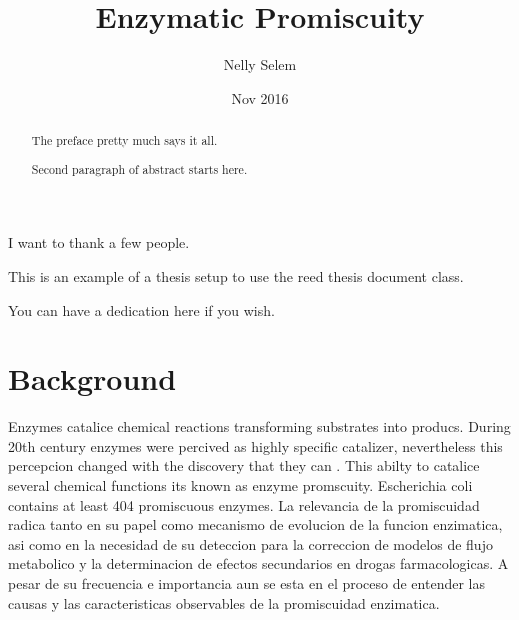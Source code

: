\documentclass[12pt,twoside]{reedthesis}
\title{Enzymatic Promiscuity}
\author{Nelly Selem}
\date{Nov 2016}
\begin{document}
      \maketitle
  
  \frontmatter %
  \pagestyle{empty} %

      \begin{acknowledgements}
      I want to thank a few people.
    \end{acknowledgements}
  
      \begin{preface}
      This is an example of a thesis setup to use the reed thesis document
      class.
    \end{preface}
  
      \hypersetup{linkcolor=black}
    \setcounter{tocdepth}{3}
    \tableofcontents
  
      \listoftables
  
      \listoffigures
  
      \begin{abstract}
      The preface pretty much says it all. \par  Second paragraph of abstract
      starts here.
    \end{abstract}
  
      \begin{dedication}
      You can have a dedication here if you wish.
    \end{dedication}
  
  \mainmatter %
  \pagestyle{fancyplain} %

  \chapter*{Background}\label{background}
  
  Enzymes catalice chemical reactions transforming substrates into
  producs. During 20th century enzymes were percived as highly specific
  catalizer, nevertheless this percepcion changed with the discovery that
  they can . This abilty to catalice several chemical functions its known
  as enzyme promscuity. Escherichia coli contains at least 404 promiscuous
  enzymes. La relevancia de la promiscuidad radica tanto en su papel como
  mecanismo de evolucion de la funcion enzimatica, asi como en la
  necesidad de su deteccion para la correccion de modelos de flujo
  metabolico y la determinacion de efectos secundarios en drogas
  farmacologicas. A pesar de su frecuencia e importancia aun se esta en el
  proceso de entender las causas y las caracteristicas observables de la
  promiscuidad enzimatica.
  
\end{document}
